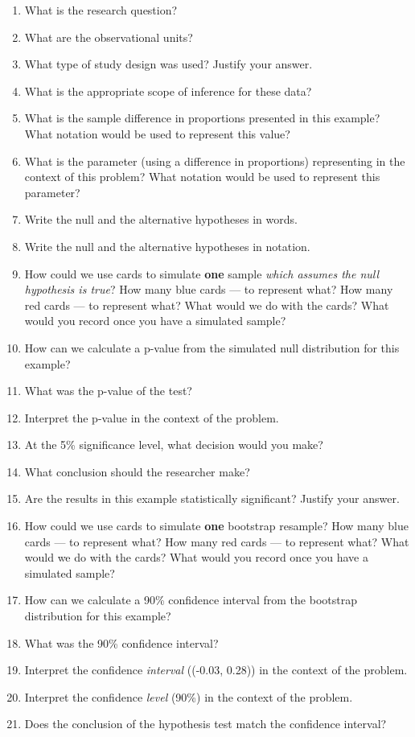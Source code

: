\documentclass[
]{report}
\newcommand{\rgs}{\vspace{12pt}} %
\begin{document}
\begin{enumerate}
\def\labelenumi{\arabic{enumi}.}
\item
  What is the research question?
  \rgs
\item
  What are the observational units?
  \rgs
\item
  What type of study design was used? Justify your answer.
  \rgs
\item
  What is the appropriate scope of inference for these data?
  \rgs
\item
  What is the sample difference in proportions presented in this example? What notation would be used to represent this value?
  \rgs
\item
  What is the parameter (using a difference in proportions) representing in the context of this problem? What notation would be used to represent this parameter?
  \rgs
  \rgs
\item
  Write the null and the alternative hypotheses in words.
  \rgs
  \rgs
\item
  Write the null and the alternative hypotheses in notation.
  \rgs
\item
  How could we use cards to simulate \textbf{one} sample \emph{which assumes the null hypothesis is true}? How many blue cards --- to represent what? How many red cards --- to represent what? What would we do with the cards? What would you record once you have a simulated sample?
  \rgs
  \rgs
  \rgs
\item
  How can we calculate a p-value from the simulated null distribution for this example?
  \rgs
  \rgs
\item
  What was the p-value of the test?
  \rgs
\item
  Interpret the p-value in the context of the problem.
  \rgs
  \rgs
\item
  At the 5\% significance level, what decision would you make?
  \rgs
\item
  What conclusion should the researcher make?
  \rgs
  \rgs
\item
  Are the results in this example statistically significant? Justify your answer.
  \rgs
\item
  How could we use cards to simulate \textbf{one} bootstrap resample? How many blue cards --- to represent what? How many red cards --- to represent what? What would we do with the cards? What would you record once you have a simulated sample?
  \rgs
  \rgs
  \rgs
\item
  How can we calculate a 90\% confidence interval from the bootstrap distribution for this example?
  \rgs
\item
  What was the 90\% confidence interval?
  \rgs
\item
  Interpret the confidence \emph{interval} ((-0.03, 0.28)) in the context of the problem.
  \rgs
  \rgs
\item
  Interpret the confidence \emph{level} (90\%) in the context of the problem.
  \rgs
  \rgs
\item
  Does the conclusion of the hypothesis test match the confidence interval?
  \rgs
\end{enumerate}
\end{document}
